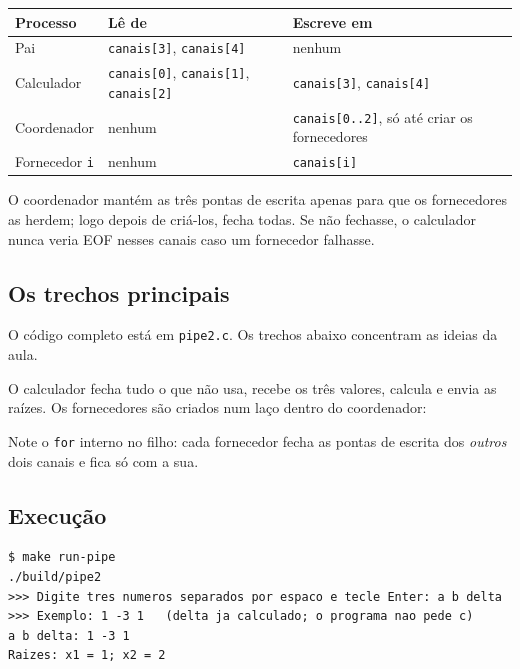 \documentclass[11pt,a4paper]{article}
\newcommand{\raiz}{../../../..}
\newcommand{\cmd}[1]{\texttt{#1}}
\begin{document}
\begin{center}
\begin{tabular}{@{}lll@{}}
\toprule
\textbf{Processo} & \textbf{Lê de} & \textbf{Escreve em} \\
\midrule
Pai & \cmd{canais[3]}, \cmd{canais[4]} & nenhum \\
Calculador & \cmd{canais[0]}, \cmd{canais[1]}, \cmd{canais[2]} & \cmd{canais[3]}, \cmd{canais[4]} \\
Coordenador & nenhum & \cmd{canais[0..2]}, só até criar os fornecedores \\
Fornecedor \cmd{i} & nenhum & \cmd{canais[i]} \\
\bottomrule
\end{tabular}
\end{center}

O coordenador mantém as três pontas de escrita apenas para que os fornecedores as herdem; logo depois de criá-los, fecha todas. Se não fechasse, o calculador nunca veria EOF nesses canais caso um fornecedor falhasse.

\subsection{Os trechos principais}

O código completo está em \cmd{pipe2.c}. Os trechos abaixo concentram as ideias da aula.



O calculador fecha tudo o que não usa, recebe os três valores, calcula e envia as raízes. Os fornecedores são criados num laço dentro do coordenador:



Note o \cmd{for} interno no filho: cada fornecedor fecha as pontas de escrita dos \emph{outros} dois canais e fica só com a sua.

\subsection{Execução}

\begin{lstlisting}[style=terminal]
$ make run-pipe
./build/pipe2
>>> Digite tres numeros separados por espaco e tecle Enter: a b delta
>>> Exemplo: 1 -3 1   (delta ja calculado; o programa nao pede c)
a b delta: 1 -3 1
Raizes: x1 = 1; x2 = 2
\end{lstlisting}
\end{document}
